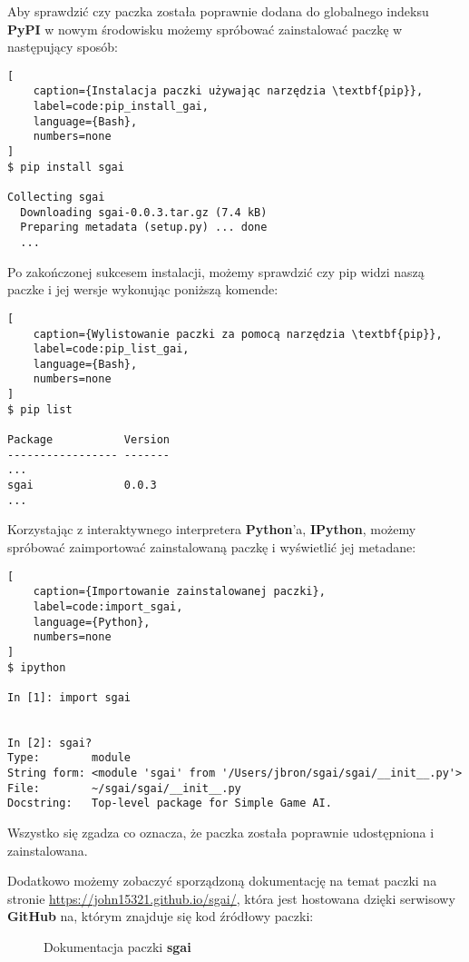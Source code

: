 Aby sprawdzić czy paczka została poprawnie dodana do globalnego indeksu \textbf{PyPI} w nowym środowisku możemy spróbować zainstalować paczkę  w następujący sposób:

\begin{onepage}
    \begin{lstlisting}[
    caption={Instalacja paczki używając narzędzia \textbf{pip}},
    label=code:pip_install_gai,
    language={Bash},
    numbers=none
]
$ pip install sgai

Collecting sgai
  Downloading sgai-0.0.3.tar.gz (7.4 kB)
  Preparing metadata (setup.py) ... done
  ...
\end{lstlisting}
\end{onepage}

Po zakończonej sukcesem instalacji, możemy sprawdzić czy pip widzi naszą paczke i jej wersje wykonując poniższą komende:

\begin{onepage}
    \begin{lstlisting}[
    caption={Wylistowanie paczki za pomocą narzędzia \textbf{pip}},
    label=code:pip_list_gai,
    language={Bash},
    numbers=none
]
$ pip list

Package           Version
----------------- -------
...
sgai              0.0.3
...
\end{lstlisting}
\end{onepage}


\clearpage

Korzystając z interaktywnego interpretera \textbf{Python}'a, \textbf{IPython}, możemy spróbować zaimportować zainstalowaną paczkę i wyświetlić jej metadane:

\begin{onepage}
    \begin{lstlisting}[
    caption={Importowanie zainstalowanej paczki},
    label=code:import_sgai,
    language={Python},
    numbers=none
]
$ ipython

In [1]: import sgai


In [2]: sgai?
Type:        module
String form: <module 'sgai' from '/Users/jbron/sgai/sgai/__init__.py'>
File:        ~/sgai/sgai/__init__.py
Docstring:   Top-level package for Simple Game AI.

\end{lstlisting}
\end{onepage}

Wszystko się zgadza co oznacza, że paczka została poprawnie udostępniona i zainstalowana.

Dodatkowo możemy zobaczyć sporządzoną dokumentację na temat paczki na stronie \url{https://john15321.github.io/sgai/}, która jest hostowana dzięki serwisowy \textbf{GitHub} na, którym znajduje się kod źródłowy paczki:


\begin{figure}[h]
    \centering
    \caption{Dokumentacja paczki \textbf{sgai}}
    \label{img:githubdocs}
\end{figure}



